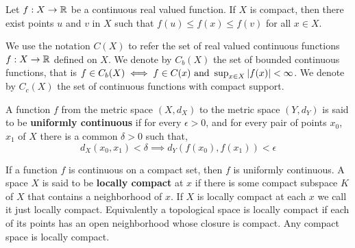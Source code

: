\begin{theorem}
	Let $f:X\rightarrow \mathbb{R}$ be a continuous real valued function. If $X$ is compact, then there exist points $u$ and $v$ in $X$ such that $f(u)\leq f(x)\leq f(v)$ for all $x\in X$.
\end{theorem}
 We use the notation $C(X)$ to refer the set of real valued continuous functions $f:X\rightarrow \mathbb{R}$ defined on $X$. We denote by $C_b(X)$ the set of bounded continuous functions, that is $f\in C_b(X) \iff f\in C(x)\ \mathrm{and}\ \sup_{x\in X} \left| f(x) \right|<\infty$. We denote by $C_c(X)$ the set of continuous functions with compact support. \\
  
  
 \begin{definition}
	A function $f$ from the metric space $(X, d_X)$ to the metric space $(Y, d_Y)$ is said to be \textbf{uniformly continuous} if for every $\epsilon>0$, and for every pair of points $x_0$, $x_1$ of $X$ there is a common $\delta>0$ such that,
	\begin{equation}
		d_X(x_0, x_1)<\delta \implies d_Y(f(x_0), f(x_1))<\epsilon
	\end{equation}  
\end{definition}
If a function $f$ is continuous on a compact set, then $f$ is uniformly continuous.
%
A space $X$ is said to be \textbf{locally compact} at $x$ if there is some compact subspace $K$ of $X$ that contains a neighborhood of $x$. If $X$ is locally compact at each $x$ we call it just locally compact. Equivalently a topological space is locally compact if each of its points has an open neighborhood whose closure is compact. Any compact space is locally compact.

